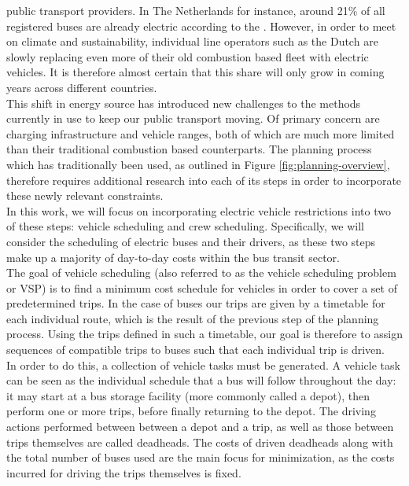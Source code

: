 \documentclass[]{article}
\begin{document}
public transport providers. In The Netherlands for instance, around 21\% of all
registered buses are already electric according to the \citet{RDW}. However,
in order to meet \citet{europaRegulation20181999} on climate and sustainability, individual
line operators such as the Dutch \citet{qbuzzQbuzz} are slowly replacing even more of their old
combustion based fleet with electric vehicles. It is therefore almost certain that this share will only grow in
coming years across different countries. \\
This shift in energy source has introduced new challenges to the methods currently in use to keep our public transport moving. Of primary concern are charging infrastructure and vehicle ranges, both of which are much more limited than their traditional combustion based counterparts. The planning process which has traditionally been used, as outlined in Figure \ref{fig:planning-overview}, therefore requires additional research into each of its steps in order to incorporate these newly relevant constraints.\\
\noindent In this work, we will focus on incorporating electric vehicle restrictions into two of these steps: vehicle scheduling and crew scheduling. Specifically, we will consider the scheduling of electric buses and their drivers, as these two steps make up a majority of day-to-day costs within the bus transit sector. \\
The goal of vehicle scheduling (also referred to as the vehicle scheduling problem or VSP) is to find a minimum cost schedule for vehicles in order to cover a set of predetermined trips. In the case of buses our trips are given by a timetable for each individual route, which is the result of the previous step of the planning process. Using the trips defined in such a timetable, our goal is therefore to assign sequences of compatible trips to buses such that each individual trip is driven. \\
In order to do this, a collection of vehicle tasks must be generated. A vehicle task can be seen as the individual schedule that a bus will follow throughout the day: it may start at a bus storage facility (more commonly called a depot), then perform one or more trips, before finally returning to the depot. The driving actions performed between between a depot and a trip, as well as those between trips themselves are called deadheads. The costs of driven deadheads along with the total number of buses used are the main focus for minimization, as the costs incurred for driving the trips themselves is fixed. \\
\end{document}
